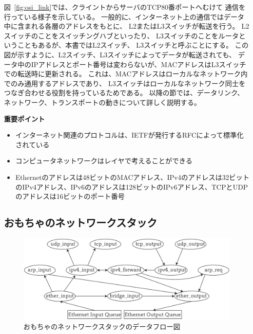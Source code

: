 図~\ref{fig:osi_link}では、クライントからサーバのTCP80番ポートへむけて
通信を行っている様子を示している。
一般的に、インターネット上の通信ではデータ中に含まれる各層のアドレスをもとに、
L2またはL3スイッチが転送を行う。
L2スイッチのことをスイッチングハブといったり、
L3スイッチのことをルータということもあるが、本書ではL2スイッチ、
L3スイッチと呼ぶことにする。
この図が示すように、L2スイッチ、L3スイッチによってデータが転送されても、
データ中のIPアドレスとポート番号は変わらないが、MACアドレスはL3スイッチでの転送時に更新される。
これは、MACアドレスはローカルなネットワーク内でのみ通用するアドレスであり、
L3スイッチはローカルなネットワーク同士をつなぎ合わせる役割を持っているためである。
以降の節では、データリンク、ネットワーク、トランスポートの動きについて詳しく説明する。

\begin{itembox}[l]{\bf 重要ポイント}
    \begin{itemize}
        \item インターネット関連のプロトコルは、IETFが発行するRFCによって標準化されている
        \item コンピュータネットワークはレイヤで考えることができる
        \item Ethernetのアドレスは48ビットのMACアドレス、IPv4のアドレスは32ビットのIPv4アドレス、IPv6のアドレスは128ビットのIPv6アドレス、TCPとUDPのアドレスは16ビットのポート番号
    \end{itemize}
\end{itembox}

\subsection{おもちゃのネットワークスタック} \label{sec:stack}

\begin{figure}[tb]
    \centering
    \includegraphics[width=14cm,pagebox=artbox]{figs/nwstack.pdf}
    \caption{おもちゃのネットワークスタックのデータフロー図}
    \label{fig:tcpipstack}
\end{figure}

